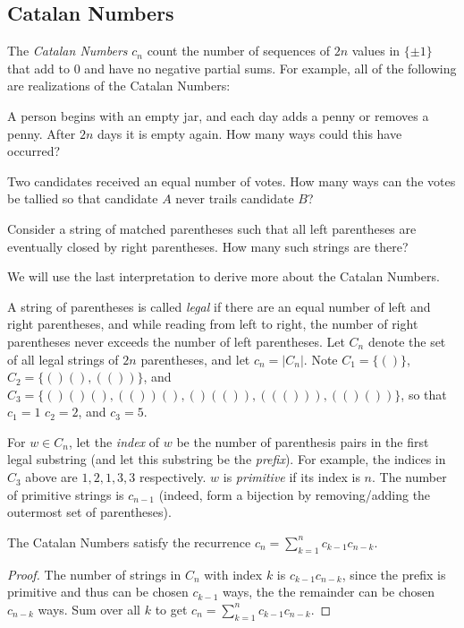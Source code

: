 \documentclass[a4paper]{article}
\begin{document}
\subsection{Catalan Numbers}

\begin{definition}
The \emph{Catalan Numbers} $c_n$ count the number of sequences of $2n$ values in $\{\pm1\}$ that add to $0$ and have no negative partial sums. For example, all of the following are realizations of the Catalan Numbers:
\begin{arrows}
\item A person begins with an empty jar, and each day adds a penny or removes a penny. After $2n$ days it is empty again. How many ways could this have occurred?
\item Two candidates received an equal number of votes. How many ways can the votes be tallied so that candidate $A$ never trails candidate $B$?
\item Consider a string of matched parentheses such that all left parentheses are eventually closed by right parentheses. How many such strings are there?
\end{arrows}
We will use the last interpretation to derive more about the Catalan Numbers.
\end{definition}

\begin{definition}
A string of parentheses is called \emph{legal} if there are an equal number of left and right parentheses, and while reading from left to right, the number of right parentheses never exceeds the number of left parentheses. Let $C_n$ denote the set of all legal strings of $2n$ parentheses, and let $c_n=|C_n|$. Note $C_1=\{()\}$, $C_2=\{()(),(())\}$, and $C_3=\{()()(),(())(),()(()),((())),(()())\}$, so that $c_1=1$ $c_2=2$, and $c_3=5$.

\medskip

For $w\in C_n$, let the \emph{index} of $w$ be the number of parenthesis pairs in the first legal substring (and let this substring be the \emph{prefix}). For example, the indices in $C_3$ above are $1,2,1,3,3$ respectively. $w$ is \emph{primitive} if its index is $n$. The number of primitive strings is $c_{n-1}$ (indeed, form a bijection by removing/adding the outermost set of parentheses).
\end{definition}

\begin{theorem}\label{catalan_recur}
The Catalan Numbers satisfy the recurrence $\displaystyle c_n=\sum_{k=1}^nc_{k-1}c_{n-k}$.

\begin{hl}
\begin{proof}
The number of strings in $C_n$ with index $k$ is $c_{k-1}c_{n-k}$, since the prefix is primitive and thus can be chosen $c_{k-1}$ ways, the the remainder can be chosen $c_{n-k}$ ways. Sum over all $k$ to get $c_n=\sum_{k=1}^nc_{k-1}c_{n-k}$.
\end{proof}
\end{hl}
\end{theorem}
\end{document}
